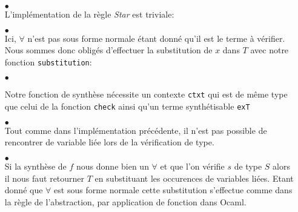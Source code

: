 \documentclass {article}
\newcommand{\codefrom}[3]
           {}
\theoremstyle{definition}
\theoremstyle{remark}
\newcommand{\fun}[1]{\lstinline!#1!}
\begin{document}
\begin{itemize}
  \codefrom{dependent}{lambda}{check_inv}

         
\item[$\bullet$] \\    

  L'implémentation de la règle \emph{Star} est triviale:
  
  \codefrom{dependent}{lambda}{check_star}

    
\item[$\bullet$] \\    
  
  Ici,  $\forall$ n'est pas sous forme normale étant donné qu'il est le terme
  à vérifier. Nous sommes donc obligés d'effectuer la substitution de $x$ dans $T$
  avec notre fonction \fun{substitution}:
  
\codefrom{dependent}{lambda}{check_pi}

\item[$\bullet$] 

Notre fonction de synthèse nécessite un contexte \fun{ctxt} qui est de même type que celui de la fonction
\fun{check} ainsi qu'un terme synthétisable \fun{exT}

    \codefrom{dependent}{lambda}{synth_head}

\item[$\bullet$] \\    

  Tout comme dans l'implémentation précédente, il n'est pas possible de rencontrer de variable 
  liée lors de la vérification de type. 

  \codefrom{dependent}{lambda}{synth_var}


\item[$\bullet$] \\    

  Si la synthèse de $f$ nous donne bien un $\forall$ et que l'on vérifie $s$ de type
  $S$ alors il nous faut retourner $T$ en substituant les occurences de variables liées.  
  Etant donné que $\forall$ est sous forme normale cette substitution s'effectue
  comme dans la règle de l'abstraction, par application de fonction dans Ocaml.
  

\end{itemize}
\end{document}
